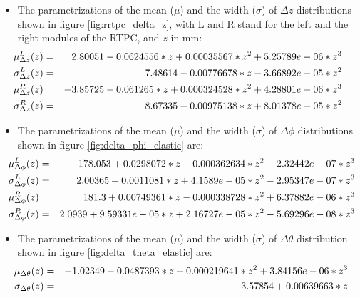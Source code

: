 \begin{itemize}

\item The parametrizations of the mean ($\mu$) and the width ($\sigma$) of 
   $\Delta z$ distributions shown in figure \ref{fig:rrtpc_delta_z}, with L and 
   R stand for the left and the right modules of the RTPC, and $z$ in mm:
\small
\begin{eqnarray}
\hspace{-0.3in} \mu_{\Delta z}^{L}(z) &=& 2.80051 -0.0624556*z +0.00035567*z^{2} +5.25789e-06*z^{3}\\
\hspace{-0.3in} \sigma_{\Delta z}^{L}(z) &=& 7.48614 -0.00776678*z -3.66892e-05*z^{2}\\
\hspace{-0.3in} \mu_{\Delta z}^{R}(z) &=& -3.85725 -0.061265*z +0.000324528*z^{2} +4.28801e-06*z^{3}\\
\hspace{-0.3in} \sigma_{\Delta z}^{R}(z) &=& 8.67335 -0.00975138*z +8.01378e-05*z^{2}
\end{eqnarray}  
\normalsize
\item  The parametrizations of the mean ($\mu$) and the width ($\sigma$) of $\Delta \phi$ distributions shown in figure \ref{fig:delta_phi_elastic} are:
\small
\begin{eqnarray}
\hspace{-0.2in} \mu_{\Delta \phi}^{L}(z) &=& 178.053 +0.0298072*z -0.000362634*z^{2} -2.32442e-07*z^{3}\\
\hspace{-0.2in} \sigma_{\Delta \phi}^{L}(z) &=& 2.00365 +0.0011081*z +4.1589e-05*z^{2} -2.95347e-07*z^{3}\\
\hspace{-0.2in} \mu_{\Delta \phi}^{R}(z) &=& 181.3 +0.00749361*z -0.000338728*z^{2} +6.37882e-06*z^{3}\\
\hspace{-0.2in} \sigma_{\Delta \phi}^{R}(z) &=& 2.0939 +9.59331e-05*z +2.16727e-05*z^{2} -5.69296e-08*z^{3}
\end{eqnarray} 
\normalsize

\item The parametrizations of the mean ($\mu$) and the width ($\sigma$) of $\Delta \theta$ distribution shown in figure \ref{fig:delta_theta_elastic} are: 
\small
\begin{eqnarray}
\hspace{-0.2in} \mu_{\Delta \theta}(z) &=& -1.02349 -0.0487393*z +0.000219641*z^{2} +3.84156e-06*z^{3}\\
\hspace{-0.2in} \sigma_{\Delta \theta}(z) &=& 3.57854 +0.00639663*z
\end{eqnarray}
\normalsize


\end{itemize}
